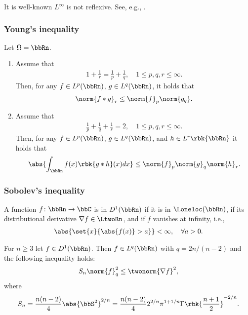 \documentclass[openany, a4paper, oneside]{jsbook}
\begin{document}
It is well-known $L^{\infty}$ is not reflexive.
See, e.g., \cite{HaimBrezis1, HaimBrezis2}.
\subsubsection{Young's inequality}

\begin{thm}\label{Lieb-Loss_Analysis_chap11_37}
 Let $\Omega = \bbRn$.
\begin{enumerate}
\item Assume that
\begin{align}
 1 + \frac{1}{r} = \frac{1}{p} + \frac{1}{q}, \quad 1 \leq p, q, r \leq \infty.
\end{align}
Then, for any $f \in L^p (\bbRn)$, $g \in L^q (\bbRn)$, it holds that
\begin{align}
 \norm{f * g}_r
 \leq
 \norm{f}_p \norm{g_q}.
\end{align}
\item Assume that
\begin{align}
  \frac{1}{p} + \frac{1}{q} + \frac{1}{r} = 2, \quad 1 \leq p, q, r \leq \infty.
\end{align}
Then, for any $f \in L^p (\bbRn)$, $g \in L^q (\bbRn)$, and $h \in L^r \rbk{\bbRn}$ it holds that
\begin{align}
 \abs{\int_{\bbRn} f (x) \rbk{g * h} (x) dx}
 \leq
 \norm{f}_p \norm{g}_q \norm{h}_r.
\end{align}
\end{enumerate}
\end{thm}
\subsubsection{Sobolev's inequality}

A function $f \colon \bbRn \to \bbC$ is in $D^1 (\bbRn)$ if it is in $\Loneloc (\bbRn)$, if its distributional derivative $\nabla f \in \LtwoRn$,
and if $f$ vanishes at infinity, i.e.,
\begin{align}
 \abs{\set{x}{\abs{f (x)} > a}} < \infty, \quad \forall a > 0.
\end{align}
\begin{thm}\label{Lieb-Loss_Analysis_chap11_4}
 For $n \geq 3$ let $f \in D^1 (\bbRn)$.
 Then $f \in L^q (\bbRn)$ with $q = 2n/ (n-2)$ and the following inequality holds:
\begin{align}
 S_n \norm{f}_{q}^2
 \leq
 \twonorm{\nabla f}^2,
\end{align}
where
\begin{align}
 S_n
 =
 \frac{n (n-2)}{4} \abs{\bbS^2}^{2/n}
 =
 \frac{n (n-2)}{4} 2^{2/n} \pi^{1 + 1/n} \Gamma \rbk{\frac{n+1}{2}}^{-2/n}.
\end{align}
\end{thm}
\end{document}
